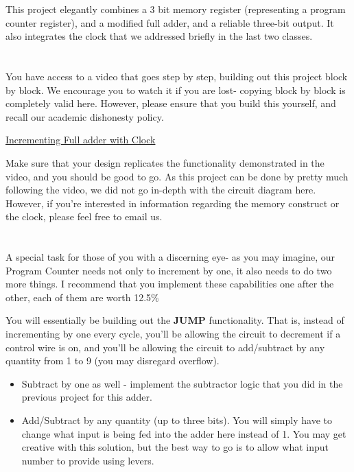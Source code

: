 \documentclass{article}
\begin{document}
This project elegantly combines a 3 bit memory register (representing a program counter register), and a modified full adder, and a reliable three-bit output.
It also integrates the clock that we addressed briefly in the last two classes. 

\section{\selectfont{Crafting is Believing}}

You have access to a video that goes step by step, building out this project block by block.
We encourage you to watch it if you are lost- copying block by block is completely valid here. 
However, please ensure that you build this yourself, and recall our academic dishonesty policy. 

\href{https://drive.google.com/file/d/1y5DlbOz2xEPjKfQTWWV6dcyvQly7oEPP/view}{Incrementing Full adder with Clock}

Make sure that your design replicates the functionality demonstrated in the video, and you should be good to go.
As this project can be done by pretty much following the video, we did not go in-depth with the circuit diagram here.
However, if you're interested in information regarding the memory construct or the clock, please feel free to email us.

\section{\selectfont{25 $\%$ Extra Credit!}}

A special task for those of you with a discerning eye- as you may imagine, our Program Counter needs not only to increment by one, it also needs to do two more things.
I recommend that you implement these capabilities one after the other, each of them are worth 12.5$\%$

You will essentially be building out the \textbf{JUMP} functionality. That is, instead of incrementing by one every cycle, you'll be allowing the circuit to decrement if a control wire is on, and you'll be allowing the circuit to add/subtract by any quantity from 1 to 9 (you may disregard overflow). 

\begin{itemize}
  \item Subtract by one as well - implement the subtractor logic that you did in the previous project for this adder. 
  \item Add/Subtract by any quantity (up to three bits). You will simply have to change what input is being fed into the adder here instead of 1. You may get creative with this solution, but the best way to go is to allow what input number to provide using levers.
\end{itemize}
\end{document}
